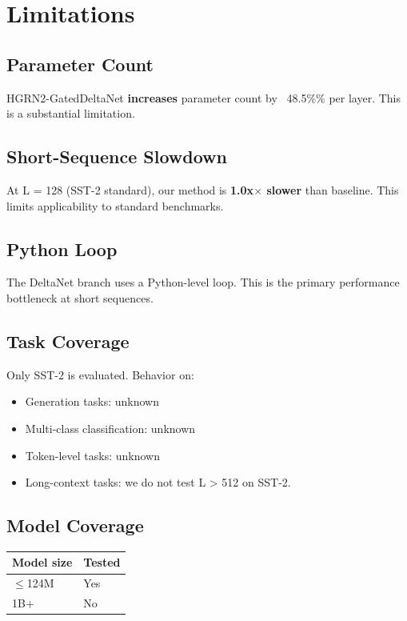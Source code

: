 \section{Limitations}

\subsection{Parameter Count}

HGRN2-GatedDeltaNet \textbf{increases} parameter count by ~48.5\%\% per 
layer. This is a substantial limitation.

\subsection{Short-Sequence Slowdown}

At L = 128 (SST-2 standard), our method is \textbf{1.0x$\times$ slower} than 
baseline. This limits applicability to standard benchmarks.

\subsection{Python Loop}

The DeltaNet branch uses a Python-level loop. This is the primary 
performance bottleneck at short sequences.

\subsection{Task Coverage}

Only SST-2 is evaluated. Behavior on:
\begin{itemize}
\item Generation tasks: unknown
\item Multi-class classification: unknown
\item Token-level tasks: unknown
\item Long-context tasks: we do not test L > 512 on SST-2.

\end{itemize}
\subsection{Model Coverage}

\begin{table}[H]
\centering
\small
\begin{tabular}{ll}
\toprule
\textbf{Model size} & \textbf{Tested} \\
\midrule
$\le$124M & Yes \\
1B+ & No \\
\bottomrule
\end{tabular}
\end{table}

